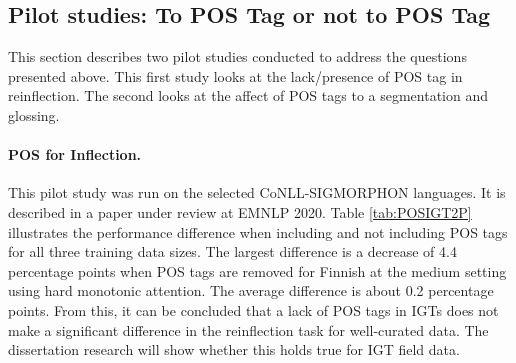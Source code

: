\subsection{Pilot studies: To POS Tag or not to POS Tag}

This section describes two pilot studies conducted to address the questions presented above. This first study looks at the lack/presence of POS tag in reinflection. The second looks at the affect of POS tags to a segmentation and glossing.

\paragraph{POS for Inflection.}
This pilot study was run on the selected CoNLL-SIGMORPHON languages. It is described in a paper under review at EMNLP 2020. 
Table \ref{tab:POSIGT2P} illustrates the performance difference when including and not including POS tags for all three training data sizes. 
The largest difference is a decrease of 4.4 percentage points when POS tags are removed for Finnish at the medium setting using hard monotonic attention. 
The average difference is about 0.2 percentage points.
From this, it can be concluded that a lack of POS tags in IGTs does not make a significant difference in the reinflection task for well-curated data. The dissertation research will show whether this holds true for IGT field data.

